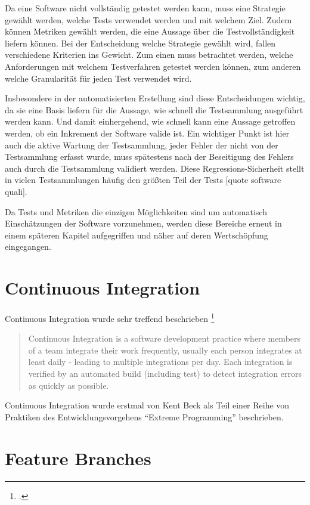 Da eine Software nicht vollständig getestet werden kann, muss eine Strategie gewählt werden, welche Tests verwendet werden und mit welchem Ziel. Zudem können Metriken gewählt werden, die eine Aussage über die Testvollständigkeit liefern können. Bei der Entscheidung welche Strategie gewählt wird, fallen verschiedene Kriterien ins Gewicht. Zum einen muss betrachtet werden, welche Anforderungen mit welchem Testverfahren getestet werden können, zum anderen welche Granularität für jeden Test verwendet wird.

Insbesondere in der automatisierten Erstellung sind diese Entscheidungen wichtig, da sie eine Basis liefern für die Aussage, wie schnell die Testsammlung ausgeführt werden kann. Und damit einhergehend, wie schnell kann eine Aussage getroffen werden, ob ein Inkrement der Software valide ist. 
Ein wichtiger Punkt ist hier auch die aktive Wartung der Testsammlung, jeder Fehler der nicht von der Testsammlung erfasst wurde, muss spätestens nach der Beseitigung des Fehlers auch durch die Testsammlung validiert werden. Diese Regressions-Sicherheit stellt in vielen Testsammlungen häufig den größten Teil der Tests [quote software quali].

Da Tests und Metriken die einzigen Möglichkeiten sind um automatisch Einschätzungen der Software vorzunehmen, werden diese Bereiche erneut in einem späteren Kapitel aufgegriffen und näher auf deren Wertschöpfung eingegangen.

\section{Continuous Integration}

Continuous Integration wurde sehr treffend beschrieben \footcite{fowler2006}
\blockquote {Continuous Integration is a software development practice where members of a team integrate their work frequently, usually each person integrates at least daily - leading to multiple integrations per day. Each integration is verified by an automated build (including test) to detect integration errors as quickly as possible.}

Continuous Integration wurde erstmal von Kent Beck als Teil einer Reihe von Praktiken des Entwicklungsvorgehens ``Extreme Programming'' beschrieben.

\section{Feature Branches}

